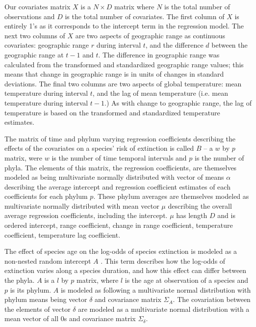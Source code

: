 \documentclass[12pt,letterpaper]{article}
\begin{document}
Our covariates matrix \(X\) is a \(N \times D\) matrix where \(N\) is the total number of observations and \(D\) is the total number of covariates. The first column of \(X\) is entirely 1's as it corresponds to the intercept term in the regression model. The next two columns of \(X\) are two aspects of geographic range as continuous covariates: geographic range \(r\) during interval \(t\), and the difference \(d\) between the geographic range at \(t - 1\) and \(t\). The difference in geographic range was calculated from the transformed and standardized geographic range values; this means that change in geographic range is in units of changes in standard deviations. The final two columns are two aspects of global temperature: mean temperature during interval \(t\), and the lag of mean temperature (i.e. mean temperature during interval \(t - 1\).) As with change to geographic range, the lag of temperature is based on the transformed and standardized temperature estimates. 

The matrix of time and phylum varying regression coefficients describing the effects of the covariates on a species' risk of extinction is called \(B\) -- a  \(w\) by \(p\) matrix, were \(w\) is the number of time temporal intervals and \(p\) is the number of phyla. The elements of this matrix, the regression coefficients, are themselves modeled as being multivariate normally distributed with vector of means \(\alpha\) describing the average intercept and regression coefficient estimates of each coefficients for each phylum \(p\). These phylum averages are themselves modeled as multivariate normally distributed with mean vector \(\mu\) describing the overall average regression coefficients, including the intercept. \(\mu\) has length \(D\) and is ordered intercept, range coefficient, change in range coefficient, temperature coefficient, temperature lag coefficient.

The effect of species age on the log-odds of species extinction is modeled as a non-nested random intercept \(A\) \citep{Tutz2016}. This term describes how the log-odds of extinction varies along a species duration, and how this effect can differ between the phyla. \(A\) is a \(l\) by \(p\) matrix, where \(l\) is the age at observation of a species and \(p\) is its phylum. \(A\) is modeled as following a multivariate normal distribution with phylum means being vector \(\delta\) and covariance matrix \(\Sigma_{A}\). The covariation between the elements of vector \(\delta\) are modeled as a multivariate normal distribution with a mean vector of all 0s and covariance matrix \(\Sigma_{\delta}\).
\end{document}

